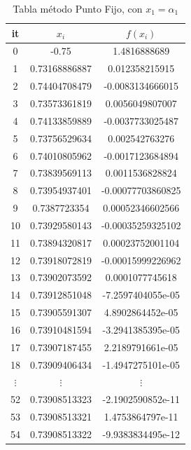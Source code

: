 \documentclass{article} %
\begin{document}
\begin{table}[H]
    \centering
    \begin{tabular}{|c|c|c|}
\hline
it & $x_i$ & $f(x_i)$\\
\hline
0 & -0.75 & 1.4816888689\\
1 & 0.73168886887 & 0.012358215915\\
2 & 0.74404708479 & -0.0083134666015\\
3 & 0.73573361819 & 0.0056049807007\\
4 & 0.74133859889 & -0.0037733025487\\
5 & 0.73756529634 & 0.002542763276\\
6 & 0.74010805962 & -0.0017123684894\\
7 & 0.73839569113 & 0.0011536828824\\
8 & 0.73954937401 & -0.00077703860825\\
9 & 0.7387723354 & 0.00052346602566\\
10 & 0.73929580143 & -0.00035259325102\\
11 & 0.73894320817 & 0.00023752001104\\
12 & 0.73918072819 & -0.00015999226962\\
13 & 0.73902073592 & 0.0001077745618\\
14 & 0.73912851048 & -7.2597404055e-05\\
15 & 0.73905591307 & 4.8902864452e-05\\
16 & 0.73910481594 & -3.2941385395e-05\\
17 & 0.73907187455 & 2.2189791661e-05\\
18 & 0.73909406434 & -1.4947275101e-05\\
$\vdots$ & $\vdots$ & $\vdots$\\
52 & 0.73908513323 & -2.1902590852e-11\\
53 & 0.73908513321 & 1.4753864797e-11\\
54 & 0.73908513322 & -9.9383834495e-12\\
\hline
\end{tabular}
    \caption{Tabla método Punto Fijo, con $x_1 = \alpha_1$}
    \label{tab3}
\end{table}
\end{document}
